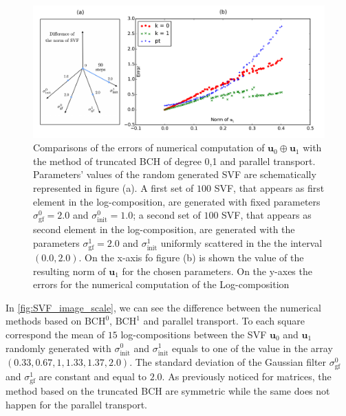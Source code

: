 \begin{figure}[!ht]
	\hspace{-1.5cm}
	\includegraphics[scale=0.6]{figures/SVF_scatter_plot.pdf}
	\caption{Comparisons of the errors of numerical computation of $\mathbf{u}_0\oplus \mathbf{u}_1$ with the method of truncated BCH of degree 0,1 and parallel transport. Parameters' values of the random generated SVF are schematically represented in figure (a). A first set of $100$ SVF, that appears as first element in the log-composition, are generated with fixed parameters $\sigma_{\text{gf}}^{0} = 2.0$ and $\sigma_{\text{init}}^{0} = 1.0$; a second set of $100$ SVF, that appears as second element in the log-composition, are generated with the parameters $\sigma_{\text{gf}}^{1} = 2.0$ and $\sigma_{\text{init}}^{1}$ uniformly scattered in the the interval $(0.0, 2.0)$. On the x-axis fo figure (b) is shown the value of the resulting norm of $\mathbf{u}_1$ for the chosen parameters. On the y-axes the errors for the numerical computation of the Log-composition  }
	\label{fig:SVF_scatter_plot}
\end{figure}

In \ref{fig:SVF_image_scale}, we can see the difference between the numerical methods based on $\text{BCH}^0$, $\text{BCH}^1$ and parallel transport. To each square correspond the mean of $15$ log-compositions between the SVF $\mathbf{u}_0$ and $\mathbf{u}_1$ randomly generated with $\sigma_{\text{init}}^{0}$ and $\sigma_{\text{init}}^{1}$ equals to one of the value in the array $(0.33, 0.67, 1, 1.33, 1.37, 2.0)$. The standard deviation of the Gaussian filter $\sigma_{\text{gf}}^{0}$ and $\sigma_{\text{gf}}^{1}$ are constant and equal to $2.0$. As previously noticed for matrices, the method based on the truncated  BCH are symmetric while the same does not happen for the parallel transport. 

